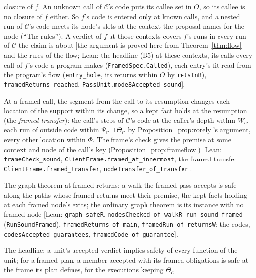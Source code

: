 \documentclass[10pt,a4paper]{article}
\theoremstyle{definition}
\theoremstyle{remark}
\newcommand{\lean}[1]{\texttt{\small #1}}
\newcommand{\status}[1]{\textsf{\small[#1]}}
\newcommand{\cC}{\mathcal{C}}
\begin{document}
\begin{description}[leftmargin=1.5em,style=nextline]
closure of $f$. An unknown call of $\cC$'s code puts its callee set in
$O$, so its callee is no closure of $f$ either. So $f$'s code is entered
only at known calls, and a nested run of $\cC$'s code meets its node's
slots at the context the proposal names for the node (``The rules'').
A verdict of $f$ at those contexts covers $f$'s runs in every run of
$\cC$ the claim is about
\status{the argument is proved here from Theorem~\ref{thm:flow} and the rules of the flow; Lean: the headline (B5) at these contexts, its calls every call of $f$'s code a program makes (\lean{FramedSpec.Called}), each entry's fit read from the program's flow (\lean{entry\_hole}, its returns within $O$ by \lean{retsInB}), \lean{framedReturns\_reached}, \lean{PassUnit.mode8Accepted\_sound}}.
\item[(B1), (B2)] At a framed call, the segment from the call to its
resumption changes each location of the support within its change, so a
kept fact holds at the resumption (the \emph{framed transfer}): the
call's steps of $\cC$'s code at the caller's depth within $W_c$, each run
of outside code within $\Psi_\cC\sqcup\Theta_\cC$ by
Proposition~\ref{prop:rorely}'s argument, every other location within
$\Phi$. The frame's check gives the premise at some context and node of
the call's key (Proposition~\ref{prop:frameflow})
\status{Lean: \lean{frameCheck\_sound}, \lean{ClientFrame.framed\_at\_innermost}, the framed transfer \lean{ClientFrame.framed\_transfer}, \lean{nodeTransfer\_of\_transfer}}.
\item[(B3)] The graph theorem at framed returns: a walk the framed pass
accepts is safe along the paths whose framed returns meet their premise,
the kept facts holding at each framed node's exits; the ordinary graph
theorem is its instance with no framed node
\status{Lean: \lean{graph\_safeR}, \lean{nodesChecked\_of\_walkR}, \lean{run\_sound\_framed} (\lean{RunSoundFramed}), \lean{framedReturns\_of\_main}, \lean{framedRun\_of\_returnsW}; the codes, \lean{codesAccepted\_guarantees}, \lean{framedCode\_of\_guarantee}}.
\item[(B5)] The headline: a unit's accepted verdict implies safety of every
function of the unit; for a framed plan, a member accepted with its
framed obligations is safe at the frame its plan defines, for the
executions keeping $\Theta_\cC$

\end{description}
\end{document}
